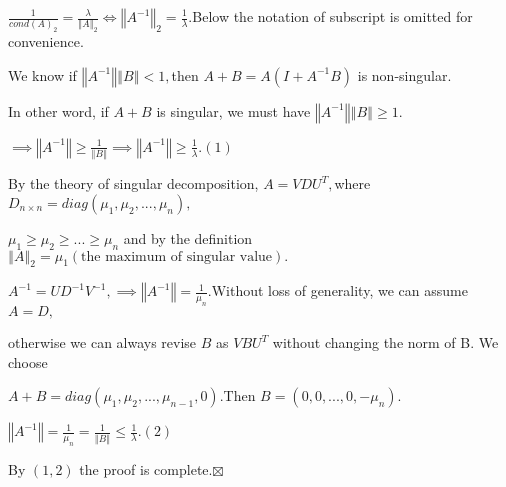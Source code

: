 \documentclass{article}
\begin{document}
$\frac{1}{cond\left( A\right) _{2}}=\frac{\lambda }{\left\Vert A\right\Vert
_{2}}\iff \left\Vert A^{-1}\right\Vert _{2}=\frac{1}{\lambda }.$Below the
notation of subscript is omitted for convenience.

We know if $\left\Vert A^{-1}\right\Vert \left\Vert B\right\Vert <1,$then $%
A+B=A(I+A^{-1}B)$ is non-singular.

In other word, if $A+B$ is singular, we must have $\left\Vert
A^{-1}\right\Vert \left\Vert B\right\Vert \geq 1.$

$\implies \left\Vert A^{-1}\right\Vert \geq \frac{1}{\left\Vert B\right\Vert 
}\implies \left\Vert A^{-1}\right\Vert \geq \frac{1}{\lambda }.\left(
1\right) $

\bigskip By the theory of singular decomposition, $A=VDU^{T},$where $%
D_{n\times n}=diag\left( \mu _{1},\mu _{2},...,\mu _{n}\right) ,$

$\mu _{1}\geq \mu _{2}\geq ...\geq \mu _{n}$ and by the definition $%
\left\Vert A\right\Vert _{2}=\mu _{1}\left( \text{the maximum of singular
value}\right) .$

$A^{-1}=UD^{-1}V^{-1},\implies \left\Vert A^{-1}\right\Vert =\frac{1}{\mu
_{n}}.$Without loss of generality, we can assume $A=D,$

otherwise we can always revise $B$ as $VBU^{T}$ without changing the norm of
B$.$ We choose

$A+B=diag\left( \mu _{1},\mu _{2},...,\mu _{n-1},0\right) .$Then $B=\left(
0,0,...,0,-\mu _{n}\right) .$

$\left\Vert A^{-1}\right\Vert =\frac{1}{\mu _{n}}=\frac{1}{\left\Vert
B\right\Vert }\leq \frac{1}{\lambda }.\left( 2\right) $

By $\left( 1,2\right) $ the proof is complete.$\boxtimes $
\end{document}
